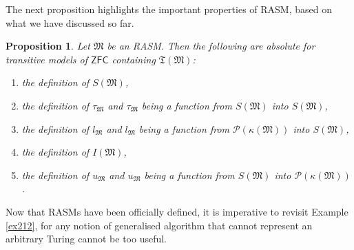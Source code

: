\documentclass[12pt, twoside]{memoir}
\numberwithin{equation}{section}
\newtheorem{prop}[thm]{Proposition}
\theoremstyle{definition}
\theoremstyle{remark}
\theoremstyle{definition}
\theoremstyle{definition}
\theoremstyle{definition}
\theoremstyle{remark}
\begin{document}
The next proposition highlights the important properties of RASM, based on what we have discussed so far.

\begin{prop}\label{prop226}
Let $\mathfrak{M}$ be an RASM. Then the following are absolute for transitive models of $\mathsf{ZFC}$ containing $\mathfrak{T}(\mathfrak{M})$:
\begin{enumerate}[label=(\arabic*)]
    \item the definition of $S(\mathfrak{M})$,
    \item the definition of $\tau_{\mathfrak{M}}$ and $\tau_{\mathfrak{M}}$ being a function from $S(\mathfrak{M})$ into $S(\mathfrak{M})$,
    \item the definition of $l_{\mathfrak{M}}$ and $l_{\mathfrak{M}}$ being a function from $\mathcal{P}(\kappa(\mathfrak{M}))$ into $S(\mathfrak{M})$,
    \item the definition of $I(\mathfrak{M})$,
    \item the definition of $u_{\mathfrak{M}}$ and $u_{\mathfrak{M}}$ being a function from $S(\mathfrak{M})$ into $\mathcal{P}(\kappa(\mathfrak{M}))$. 
\end{enumerate}
\end{prop}

Now that RASMs have been officially defined, it is imperative to revisit Example \ref{ex212}, for any notion of generalised algorithm that cannot represent an arbitrary Turing cannot be too useful.
\end{document}

